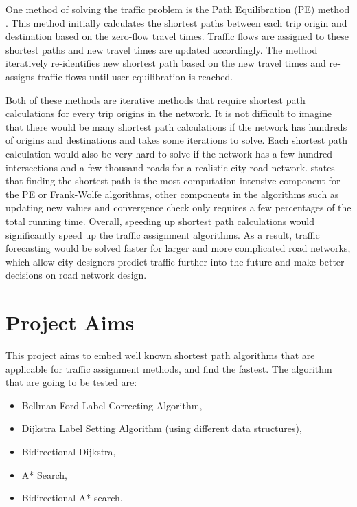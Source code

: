 One method of solving the traffic problem is the Path Equilibration (PE) method \citep{Florian}.
This method initially calculates the shortest paths between each trip origin and destination based on the zero-flow travel times.
Traffic flows are assigned to these shortest paths and new travel times are updated accordingly.
The method iteratively re-identifies new shortest path based on the new travel times and re-assigns traffic flows until user equilibration is reached.


Both of these methods are iterative methods that require shortest path calculations for every trip origins in the network.
It is not difficult to imagine that there would be many shortest path calculations if the network has hundreds of origins and destinations and takes some iterations to solve.
Each shortest path calculation would also be very hard to solve if the network has a few hundred intersections and a few thousand roads for a realistic city road network.
\citet{Sheffi} states that finding the shortest path is the most computation intensive component for the PE or Frank-Wolfe algorithms, 
other components in the algorithms such as updating new values and convergence check only requires a few percentages of the total running time.
Overall, speeding up shortest path calculations would significantly speed up the traffic assignment algorithms.
As a result,
traffic forecasting would be solved faster for larger and more complicated road networks,
which allow city designers predict traffic further into the future and make better decisions on road network design.

\section{Project Aims}
This project aims to embed well known shortest path algorithms that are applicable for traffic assignment methods, and find the fastest.
The algorithm that are going to be tested are:
\begin{itemize}
    \item Bellman-Ford Label Correcting Algorithm,
    \item Dijkstra Label Setting Algorithm (using different data structures),
    \item Bidirectional Dijkstra,
    \item A* Search,
    \item Bidirectional A* search.
\end{itemize}

